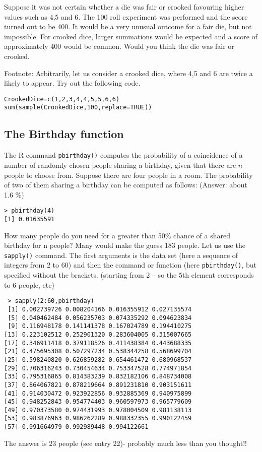 \documentclass[11pt]{article} %
\begin{document}
Suppose it was not certain whether a die was fair or crooked favouring higher values such as 4,5 and 6. The 100 roll experiment was performed and the score turned out to be 400.  It would be a very unusual outcome for a fair die, but not impossible. For crooked dice, larger summations would be expected and a score of approximately 400 would be common. Would you think the die was fair or crooked.

Footnote: Arbitrarily, let us consider a crooked dice, where 4,5 and 6 are twice a likely to appear. Try out the following code.
\begin{verbatim}
CrookedDice=c(1,2,3,4,4,5,5,6,6)
sum(sample(CrookedDice,100,replace=TRUE))
\end{verbatim}

\newpage
\subsection{The Birthday function}
The R command \texttt{pbirthday()} computes the probability of a coincidence of a number of randomly chosen people sharing a birthday, given that there are $n$ people to choose from.
Suppose there are four people in a room. The probability of two of them sharing a birthday can be computed as follows: (Answer:  about 1.6 \%)
\begin{verbatim}
> pbirthday(4)
[1] 0.01635591
\end{verbatim}



\noindent How many people do you need for a greater than 50\% chance of a shared birthday for n people? Many would make the guess 183 people.  Let us use the \texttt{sapply()} command. The first arguments is the data set (here a sequence of integers from 2 to 60) and then the command or function (here \texttt{pbirthday()}, but specified without the brackets.
(starting from 2 – so the 5th element corresponds to 6 people, etc)
\begin{verbatim}
 > sapply(2:60,pbirthday)
 [1] 0.002739726 0.008204166 0.016355912 0.027135574
 [5] 0.040462484 0.056235703 0.074335292 0.094623834
 [9] 0.116948178 0.141141378 0.167024789 0.194410275
[13] 0.223102512 0.252901320 0.283604005 0.315007665
[17] 0.346911418 0.379118526 0.411438384 0.443688335
[21] 0.475695308 0.507297234 0.538344258 0.568699704
[25] 0.598240820 0.626859282 0.654461472 0.680968537
[29] 0.706316243 0.730454634 0.753347528 0.774971854
[33] 0.795316865 0.814383239 0.832182106 0.848734008
[37] 0.864067821 0.878219664 0.891231810 0.903151611
[41] 0.914030472 0.923922856 0.932885369 0.940975899
[45] 0.948252843 0.954774403 0.960597973 0.965779609
[49] 0.970373580 0.974431993 0.978004509 0.981138113
[53] 0.983876963 0.986262289 0.988332355 0.990122459
[57] 0.991664979 0.992989448 0.994122661
\end{verbatim}
The answer is 23 people (see entry 22)- probably much less than you thought!!
\end{document}

